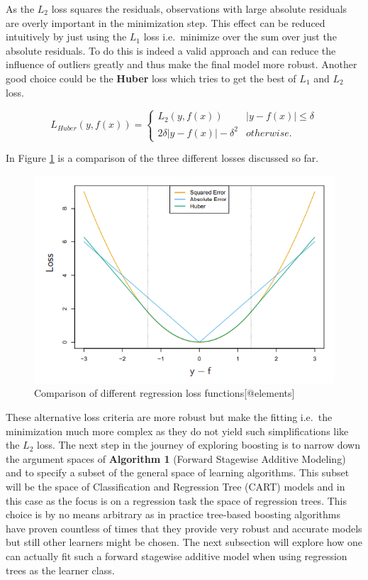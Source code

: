 \documentclass[
]{book}
\begin{document}
As the \(L_2\) loss squares the residuals, observations with large absolute residuals are overly important in the minimization step. This effect can be reduced intuitively by just using the \(L_1\) loss i.e.~minimize over the sum over just the absolute residuals. To do this is indeed a valid approach and can reduce the influence of outliers greatly and thus make the final model more robust. Another good choice could be the \textbf{Huber} loss which tries to get the best of \(L_1\) and \(L_2\) loss.\citep{elements}

\begin{equation}
  L_{Huber}(y,f(x)) = \begin{cases}L_2(y,f(x)) & |y-f(x)| \leq \delta \\
  2\delta |y-f(x)| - \delta^2 & otherwise.
  \end{cases}
  \label{eq:huberLoss}
\end{equation}

In Figure \ref{fig:lossComp} is a comparison of the three different losses discussed so far.

\begin{figure}

{\centering \includegraphics[width=0.7\linewidth]{_pictures/huber_loss} 

}

\caption{Comparison of different regression loss functions[@elements]}\label{fig:lossComp}
\end{figure}

These alternative loss criteria are more robust but make the fitting i.e.~the minimization much more complex as they do not yield such simplifications like the \(L_2\) loss.\citep{elements} The next step in the journey of exploring boosting is to narrow down the argument spaces of \textbf{Algorithm 1} (Forward Stagewise Additive Modeling) and to specify a subset of the general space of learning algorithms. This subset will be the space of Classification and Regression Tree (CART) models and in this case as the focus is on a regression task the space of regression trees. This choice is by no means arbitrary as in practice tree-based boosting algorithms have proven countless of times that they provide very robust and accurate models but still other learners might be chosen.\citep[\citet{HandsOnMLwithR}]{elements} The next subsection will explore how one can actually fit such a forward stagewise additive model when using regression trees as the learner class.
\end{document}
